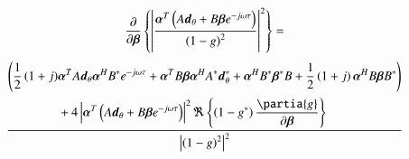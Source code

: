 \begin{align*}
    \frac{\partial}{\partial{\boldsymbol{\beta}}}
    \left\{\left|\frac{
    \boldsymbol{\alpha}^{T}\left(
    A\boldsymbol{d}_{\theta}+B\boldsymbol{\beta}e^{-j\omega\tau}
    \right)
    }{
    \left(1-g\right)^{2}
    }\right|^{2}\right\}
    =
\end{align*}
\begin{align}
    \frac{
    \begin{align*}
        \Biggl(
        \frac{1}{2}\left(1+j\right)&\vecnot{\alpha}^{T}A\vecnot{d}_{\theta}\vecnot{\alpha}^{H}B^{*}e^{-j\omega\tau}
        +
        \vecnot{\alpha}^{T}B\vecnot{\beta}\vecnot{\alpha}^{H}A^{*}\vecnot{d}_{\theta}^{*}
        +
        \vecnot{\alpha}^{H}B^{*}\vecnot{\beta}^{*}B
        +
        \frac{1}{2}\left(1+j\right)\vecnot{\alpha}^{H}B\vecnot{\beta}B^{*}
        \Biggl)
        \\
        &+4\left|
        \vecnot{\alpha}^{T}\left(
        A\vecnot{d}_{\theta}+B\vecnot{\beta}e^{-j\omega\tau}
        \right)
        \right|^{2}
        \Re\left\{\left(1-g^{*}\right)\frac{\partia{g}}{\partial{\vecnot{\beta}}}\right\}
    \end{align*}
    }{
    \left|\left(1-g\right)^{2}\right|^{2}
    }
\end{align}
